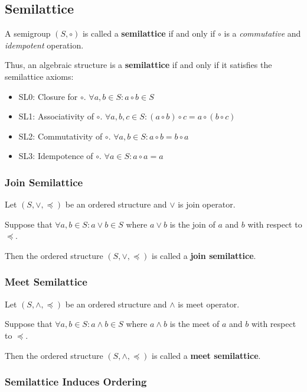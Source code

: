 \subsection{Semilattice}
A semigroup $(S, \circ)$ is called a \textbf{semilattice} if and only
if $\circ$ is a \textit{commutative} and \textit{idempotent}
operation.

Thus, an algebraic structure is a \textbf{semilattice} if and only if
it satisfies the semilattice axioms:

\begin{itemize}
\item SL0: Closure for $\circ$. $\forall a, b \in S: a \circ b \in S$
\item SL1: Associativity of $\circ$.
  $\forall a, b, c \in S: (a \circ b) \circ c = a \circ (b \circ c)$
\item SL2: Commutativity of $\circ$.
  $\forall a, b \in S: a \circ b = b \circ a$
\item SL3: Idempotence of $\circ$. $\forall a \in S: a \circ a = a$
\end{itemize}


\subsubsection{Join Semilattice}
Let $(S, \vee, \preceq)$ be an ordered structure and $\vee$ is join
operator.

Suppose that $\forall a, b \in S: a \vee b \in S$ where $a \vee b$ is
the join of $a$ and $b$ with respect to $\preceq$.

Then the ordered structure $(S, \vee, \preceq)$ is called a
\textbf{join semilattice}.


\subsubsection{Meet Semilattice}
Let $(S, \wedge, \preceq)$ be an ordered structure and $\wedge$ is meet
operator.

Suppose that $\forall a, b \in S: a \wedge b \in S$ where $a \wedge b$ is
the meet of $a$ and $b$ with respect to $\preceq$.

Then the ordered structure $(S, \wedge, \preceq)$ is called a
\textbf{meet semilattice}.


\subsubsection{Semilattice Induces Ordering}
\label{sec:semilattice-induces-ordering}

